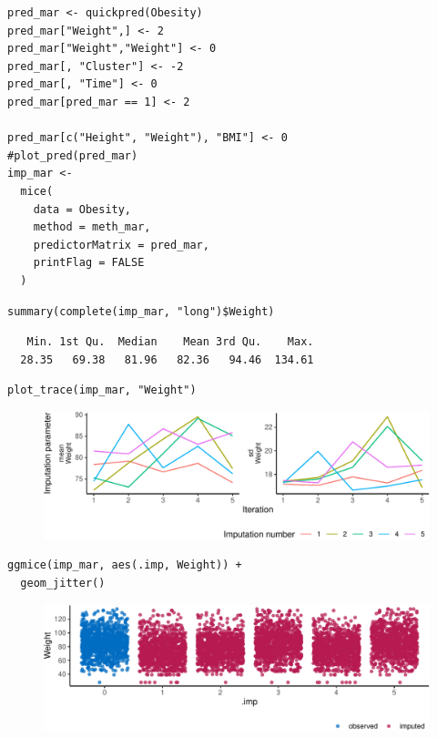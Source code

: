 \documentclass[
  article]{jss}
\begin{document}
\begin{verbatim}
pred_mar <- quickpred(Obesity)
pred_mar["Weight",] <- 2
pred_mar["Weight","Weight"] <- 0
pred_mar[, "Cluster"] <- -2 
pred_mar[, "Time"] <- 0
pred_mar[pred_mar == 1] <- 2

pred_mar[c("Height", "Weight"), "BMI"] <- 0
#plot_pred(pred_mar)
imp_mar <-
  mice(
    data = Obesity,
    method = meth_mar,
    predictorMatrix = pred_mar,
    printFlag = FALSE
  )
\end{verbatim}

\begin{verbatim}
summary(complete(imp_mar, "long")$Weight)
\end{verbatim}

\begin{verbatim}
   Min. 1st Qu.  Median    Mean 3rd Qu.    Max. 
  28.35   69.38   81.96   82.36   94.46  134.61 
\end{verbatim}

\begin{verbatim}
plot_trace(imp_mar, "Weight")
\end{verbatim}

\begin{figure}[h]

{\centering \includegraphics{manuscript_files/figure-pdf/obesity-predmar_pmm1-1.pdf}

}

\end{figure}

\begin{verbatim}
ggmice(imp_mar, aes(.imp, Weight)) + 
  geom_jitter()
\end{verbatim}

\begin{figure}[h]

{\centering \includegraphics{manuscript_files/figure-pdf/obesity-predmar_pmm1-2.pdf}

}

\end{figure}
\end{document}
